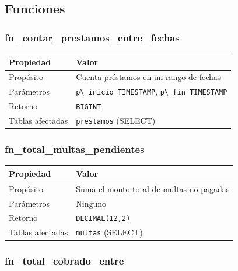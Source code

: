 \documentclass[
11pt,
a4paper,
]{report}
\newcommand{\passthrough}[1]{#1}
\begin{document}
	\hypertarget{funciones}{%
		\subsection{Funciones}\label{funciones}}
	
	\hypertarget{fn_contar_prestamos_entre_fechas}{%
		\subsubsection{fn\_contar\_prestamos\_entre\_fechas}\label{fn_contar_prestamos_entre_fechas}}
	
	\begin{longtable}[]{@{}ll@{}}
		\toprule\noalign{}
		Propiedad & Valor \\
		\midrule\noalign{}
		\endhead
		\bottomrule\noalign{}
		\endlastfoot
		Propósito & Cuenta préstamos en un rango de fechas \\
		Parámetros & \passthrough{\lstinline!p\_inicio TIMESTAMP!}, \passthrough{\lstinline!p\_fin TIMESTAMP!} \\
		Retorno & \passthrough{\lstinline!BIGINT!} \\
		Tablas afectadas & \passthrough{\lstinline!prestamos!} (SELECT) \\
	\end{longtable}
	
	\hypertarget{fn_total_multas_pendientes}{%
		\subsubsection{fn\_total\_multas\_pendientes}\label{fn_total_multas_pendientes}}
	
	\begin{longtable}[]{@{}ll@{}}
		\toprule\noalign{}
		Propiedad & Valor \\
		\midrule\noalign{}
		\endhead
		\bottomrule\noalign{}
		\endlastfoot
		Propósito & Suma el monto total de multas no pagadas \\
		Parámetros & Ninguno \\
		Retorno & \passthrough{\lstinline!DECIMAL(12,2)!} \\
		Tablas afectadas & \passthrough{\lstinline!multas!} (SELECT) \\
	\end{longtable}
	
	\hypertarget{fn_total_cobrado_entre}{%
		\subsubsection{fn\_total\_cobrado\_entre}\label{fn_total_cobrado_entre}}
	
\end{document}
